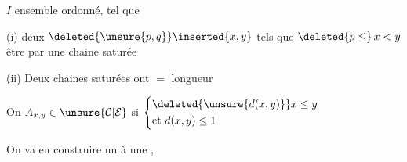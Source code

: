 $I$ ensemble ordonné, tel que

(i) deux  $\deleted{\unsure{p,q}}\inserted{x,y}$ tels que $\deleted{p\leq}\,x<y$  être  par une chaine saturée

(ii) Deux chaines saturées ont $=$ longueur

 On  $A_{x,y}\in\unsure{\mathcal C|\mathcal E}$ si $\left\{\begin{aligned}&\deleted{\unsure{d(x,y)}}x\leq y\\&\text{et }d(x,y)\leq1\end{aligned}\right.$

On va en construire un   à une  ,
